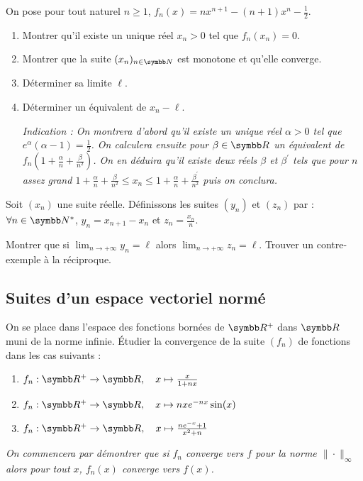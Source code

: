 \begin{exercice}
On pose pour tout naturel $n\geqslant1$, $f_{n}(x)=nx^{n+1}-(n+1)x^{n}-\frac{1}{2}$.
\begin{enumerate}
    \item Montrer qu'il existe un unique réel $x_{n}>0$ tel que $f_{n}(x_{n})=0$.
    \item Montrer que la suite $(x_{n})_{n\in\N}$ est monotone et qu'elle converge.
    \item Déterminer sa limite $\ell$.
    \item Déterminer un équivalent de $x_{n}-\ell$.

    \textit{Indication : On montrera d'abord qu'il existe un unique réel $\alpha>0$ tel que $e^{\alpha}(\alpha-1)=\frac{1}{2}$. 
    On calculera ensuite pour $\beta\in\R$ un équivalent de $f_{n}\left(1+\frac{\alpha}{n}+\frac{\beta}{n^{2}}\right)$. 
    On en déduira qu'il existe deux réels $\beta$ et $\beta^{\prime}$ tels que pour $n$ assez grand 
    $1+\frac{\alpha}{n}+\frac{\beta}{n^{2}}\leqslant x_{n}\leqslant 1+\frac{\alpha}{n}+\frac{\beta^{\prime}}{n^{2}}$ puis on conclura.}
\end{enumerate}
\end{exercice}

\begin{exercice}
    Soit $(x_{n})$ une suite réelle. Définissons les suites $(y_{n})$ et $(z_{n})$ par :
    $\forall n\in\N^{*}$, $y_{n}=x_{n+1}-x_{n}$ et $z_{n}=\frac{x_{n}}{n}$.

    Montrer que si $\lim_{n \to + \infty} y_{n} = \ell$ alors $\lim_{n \to + \infty} z_{n} = \ell$.
    Trouver un contre-exemple à la réciproque.
\end{exercice}

\subsection{Suites d'un espace vectoriel normé}

\begin{exercice}
    On se place dans l'espace des fonctions bornées de $\R^{+}$ dans $\R$ muni de la norme infinie.
    Étudier la convergence de la suite $(f_{n})$ de fonctions dans les cas suivants :
    \begin{enumerate}
        \item $f_{n}:\R^{+}\rightarrow\R, \quad x\mapsto\frac{x}{1+nx}$
        \item $f_{n}:\R^{+}\rightarrow\R, \quad x\mapsto nxe^{-nx}\sin(x)$
        \item $f_{n}:\R^{+}\rightarrow\R, \quad x\mapsto\frac{ne^{-x}+1}{x^{2}+n}$
    \end{enumerate}
    \textit{On commencera par démontrer que si $f_{n}$ converge vers $f$ pour la norme $\|\cdot\|_{\infty}$ alors pour tout $x$, $f_{n}(x)$ converge vers $f(x)$.}
\end{exercice}

